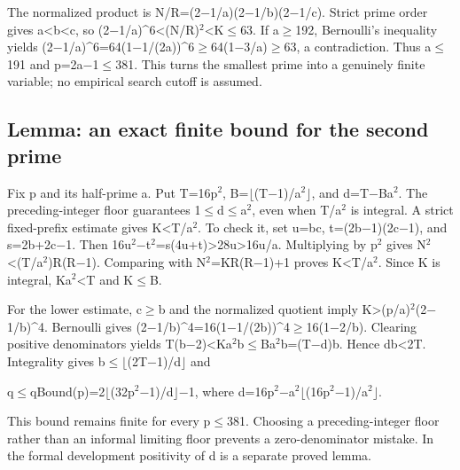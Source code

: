 \documentclass[11pt,a4paper]{article}
\begin{document}
The normalized product is N/R=(2\ensuremath{-}1/a)(2\ensuremath{-}1/b)(2\ensuremath{-}1/c). Strict prime order gives a<b<c, so (2\ensuremath{-}1/a)\textasciicircum{}6<(N/R)\ensuremath{^2}<K\ensuremath{\leq}63. If a\ensuremath{\geq}192, Bernoulli's inequality yields (2\ensuremath{-}1/a)\textasciicircum{}6=64(1\ensuremath{-}1/(2a))\textasciicircum{}6\ensuremath{\geq}64(1\ensuremath{-}3/a)\ensuremath{\geq}63, a contradiction. Thus a\ensuremath{\leq}191 and p=2a\ensuremath{-}1\ensuremath{\leq}381. This turns the smallest prime into a genuinely finite variable; no empirical search cutoff is assumed.

\subsection{Lemma: an exact finite bound for the second prime}
Fix p and its half-prime a. Put T=16p\ensuremath{^2}, B=\ensuremath{\lfloor}(T\ensuremath{-}1)/a\ensuremath{^2}\ensuremath{\rfloor}, and d=T\ensuremath{-}Ba\ensuremath{^2}. The preceding-integer floor guarantees 1\ensuremath{\leq}d\ensuremath{\leq}a\ensuremath{^2}, even when T/a\ensuremath{^2} is integral. A strict fixed-prefix estimate gives K<T/a\ensuremath{^2}. To check it, set u=bc, t=(2b\ensuremath{-}1)(2c\ensuremath{-}1), and s=2b+2c\ensuremath{-}1. Then 16u\ensuremath{^2}\ensuremath{-}t\ensuremath{^2}=s(4u+t)>28u>16u/a. Multiplying by p\ensuremath{^2} gives N\ensuremath{^2}<(T/a\ensuremath{^2})R(R\ensuremath{-}1). Comparing with N\ensuremath{^2}=KR(R\ensuremath{-}1)+1 proves K<T/a\ensuremath{^2}. Since K is integral, Ka\ensuremath{^2}<T and K\ensuremath{\leq}B.

For the lower estimate, c\ensuremath{\geq}b and the normalized quotient imply K>(p/a)\ensuremath{^2}(2\ensuremath{-}1/b)\textasciicircum{}4. Bernoulli gives (2\ensuremath{-}1/b)\textasciicircum{}4=16(1\ensuremath{-}1/(2b))\textasciicircum{}4\ensuremath{\geq}16(1\ensuremath{-}2/b). Clearing positive denominators yields T(b\ensuremath{-}2)<Ka\ensuremath{^2}b\ensuremath{\leq}Ba\ensuremath{^2}b=(T\ensuremath{-}d)b. Hence db<2T. Integrality gives b\ensuremath{\leq}\ensuremath{\lfloor}(2T\ensuremath{-}1)/d\ensuremath{\rfloor} and

q\ensuremath{\leq}qBound(p)=2\ensuremath{\lfloor}(32p\ensuremath{^2}\ensuremath{-}1)/d\ensuremath{\rfloor}\ensuremath{-}1, where d=16p\ensuremath{^2}\ensuremath{-}a\ensuremath{^2}\ensuremath{\lfloor}(16p\ensuremath{^2}\ensuremath{-}1)/a\ensuremath{^2}\ensuremath{\rfloor}.

This bound remains finite for every p\ensuremath{\leq}381. Choosing a preceding-integer floor rather than an informal limiting floor prevents a zero-denominator mistake. In the formal development positivity of d is a separate proved lemma.
\end{document}
